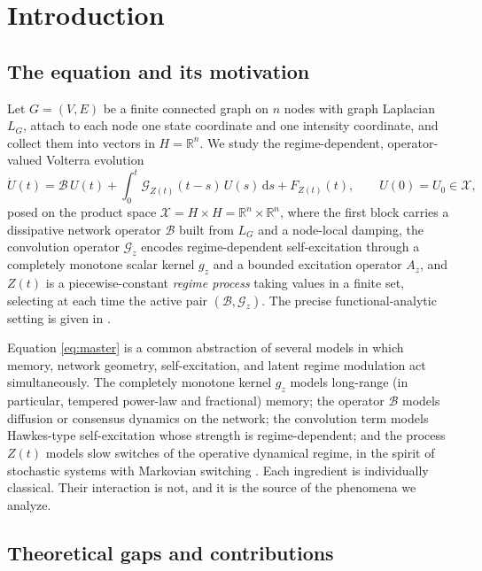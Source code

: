 \documentclass[11pt]{article}
\theoremstyle{plain}
\theoremstyle{definition}
\theoremstyle{remark}
\newcommand{\R}{\mathbb{R}}
\newcommand{\X}{\mathcal{X}}
\newcommand{\Bop}{\mathcal{B}}
\newcommand{\Gop}{\mathcal{G}}
\newcommand{\dd}{\mathrm{d}}
\begin{document}
\section{Introduction}
\label{sec:intro}

\subsection{The equation and its motivation}

Let $G=(V,E)$ be a finite connected graph on $n$ nodes with graph Laplacian $L_G$, attach to each
node one state coordinate and one intensity coordinate, and collect them into vectors in
$H=\R^n$. We study the regime-dependent, operator-valued Volterra evolution
\begin{equation}
\label{eq:master}
\dot U(t) = \Bop\,U(t) + \int_0^t \Gop_{Z(t)}(t-s)\,U(s)\,\dd s + F_{Z(t)}(t),
\qquad U(0)=U_0\in\X,
\end{equation}
posed on the product space $\X=H\times H=\R^n\times\R^n$, where the first block carries a
dissipative network operator $\Bop$ built from $L_G$ and a node-local damping, the convolution
operator $\Gop_z$ encodes regime-dependent self-excitation through a completely monotone scalar
kernel $g_z$ and a bounded excitation operator $A_z$, and $Z(t)$ is a piecewise-constant
\emph{regime process} taking values in a finite set, selecting at each time the active pair
$(\Bop,\Gop_z)$. The precise functional-analytic setting is given in
.

Equation \eqref{eq:master} is a common abstraction of several models in which memory, network
geometry, self-excitation, and latent regime modulation act simultaneously. The completely
monotone kernel $g_z$ models long-range (in particular, tempered power-law and fractional)
memory; the operator $\Bop$ models diffusion or consensus dynamics on the network; the
convolution term models Hawkes-type self-excitation whose strength is regime-dependent; and the
process $Z(t)$ models slow switches of the operative dynamical regime, in the spirit of
stochastic systems with Markovian switching \cite{mao2006}. Each ingredient is
individually classical. Their interaction is not, and it is the source of the phenomena we
analyze.

\subsection{Theoretical gaps and contributions}
\end{document}
